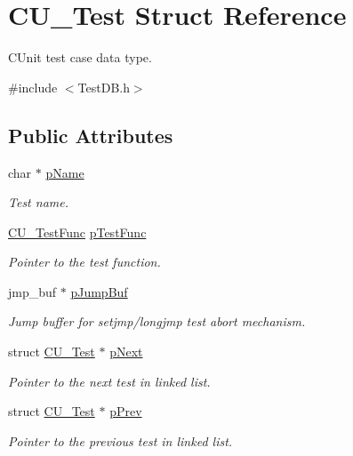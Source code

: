 \hypertarget{struct_c_u___test}{\section{C\+U\+\_\+\+Test Struct Reference}
\label{struct_c_u___test}
}


C\+Unit test case data type.  




{\ttfamily \#include $<$Test\+D\+B.\+h$>$}

\subsection*{Public Attributes}
\begin{DoxyCompactItemize}
\item 
char $\ast$ \hyperlink{struct_c_u___test_ae1f688f9e108805d7f59ee364c5eb2a2}{p\+Name}
\begin{DoxyCompactList}\small\item\em Test name. \end{DoxyCompactList}\item 
\hyperlink{group___framework_ga5868148b642b30635b8fe7f095c5b493}{C\+U\+\_\+\+Test\+Func} \hyperlink{struct_c_u___test_a9543ec07c51ec70a40cdd845ce3bf55b}{p\+Test\+Func}
\begin{DoxyCompactList}\small\item\em Pointer to the test function. \end{DoxyCompactList}\item 
jmp\+\_\+buf $\ast$ \hyperlink{struct_c_u___test_ada5212c6bacdbaf9319968d895a69ce4}{p\+Jump\+Buf}
\begin{DoxyCompactList}\small\item\em Jump buffer for setjmp/longjmp test abort mechanism. \end{DoxyCompactList}\item 
struct \hyperlink{struct_c_u___test}{C\+U\+\_\+\+Test} $\ast$ \hyperlink{struct_c_u___test_abca70319a9ee946094bd7de3e3207141}{p\+Next}
\begin{DoxyCompactList}\small\item\em Pointer to the next test in linked list. \end{DoxyCompactList}\item 
struct \hyperlink{struct_c_u___test}{C\+U\+\_\+\+Test} $\ast$ \hyperlink{struct_c_u___test_a1b0ae6d72f43397547a0ff3680001c24}{p\+Prev}
\begin{DoxyCompactList}\small\item\em Pointer to the previous test in linked list. \end{DoxyCompactList}\end{DoxyCompactItemize}



